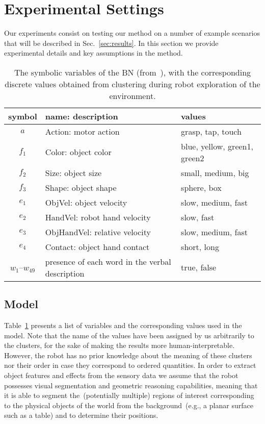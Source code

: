 \section{Experimental Settings}
\label{sec:experimental_settings}
Our experiments consist on testing our method on a number of example scenarios that will be described in Sec.~\ref{sec:results}.
In this section we provide experimental details and key assumptions in the method.

\begin{table}
    \centering
    \caption{The symbolic variables of the \acl{BN} (from~\cite{salvi:2012:smcb}), with the corresponding discrete values obtained from clustering during robot exploration of the environment.}
    \label{tab:bnsymb}
    \begin{tabular}{cp{3.3cm}l}
    \toprule
    symbol & name: description     & values \\
    \midrule
    $a$ & Action: motor action          & grasp, tap, touch \\
    \midrule
    $f_1$ & Color: object color   & blue, yellow, green1, green2 \\
    $f_2$ & Size: object size     & small, medium, big \\
    $f_3$ & Shape: object shape    & sphere, box \\ %
    \midrule
    $e_1$ & ObjVel: object velocity & slow, medium, fast \\
    $e_2$ & HandVel: robot hand velocity & slow, fast \\
    $e_3$ & ObjHandVel: relative \objecthand{} velocity & slow, medium, fast \\
    $e_4$ & Contact: object hand contact & short, long \\
    \midrule
    $w_1$--$w_{49}$ & presence of each word in the verbal description & true, false \\
    \bottomrule
    \end{tabular}
\end{table}

\subsection{\AffWords{} Model}
Table~\ref{tab:bnsymb} presents a list of variables and the corresponding values used in the \AffWords{} model.
Note that the name of the values have been assigned by us arbitrarily to the clusters, for the sake of making the results more human-interpretable.
However, the robot has no prior knowledge about the meaning of these clusters nor their order in case they correspond to ordered quantities.
In order to extract object features and effects from the sensory data we assume that the robot possesses visual segmentation and geometric reasoning capabilities, meaning that it is able to segment the~(potentially multiple) regions of interest corresponding to the physical objects of the world from the background~(e.g., a planar surface such as a table) and to determine their positions.

